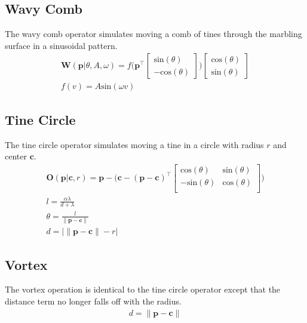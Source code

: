 \documentclass{article}
\newcommand{\cb}{\boldsymbol{c}}
\newcommand{\pb}{\boldsymbol{p}}
\renewcommand{\sin}{\text{sin}}
\renewcommand{\cos}{\text{cos}}
\begin{document}
\subsection{Wavy Comb}
The wavy comb operator simulates moving a comb of tines through the marbling surface in a sinusoidal pattern.
\begin{gather*}
	\boldsymbol{W}(\pb| \theta, A, \omega) = f\bigg(\pb^\top \begin{bmatrix}
	\sin(\theta)\\
	 -\cos(\theta)
	\end{bmatrix}\bigg) \begin{bmatrix}
	\cos(\theta)\\
	 \sin(\theta)
	\end{bmatrix}\\
    f(v) = A \sin(\omega v)
\end{gather*}

\subsection{Tine Circle}
The tine circle operator simulates moving a tine in a circle with radius $r$ and center $\cb$.
\begin{gather*}
	\boldsymbol{O}(\pb | \cb, r) =  \pb - \bigg(\cb - (\pb - \cb) ^ \top \begin{bmatrix}
	\cos(\theta) &\sin(\theta)\\
	-\sin(\theta) &\cos(\theta)\\
	\end{bmatrix} \bigg)\\
	l = \frac{\alpha \lambda}{d + \lambda}\\
	\theta = \frac{l}{\lVert\pb - \cb\rVert}\\
    d = |\lVert \pb - \cb\rVert - r|
\end{gather*}

\subsection{Vortex}
The vortex operation is identical to the tine circle operator except that the distance term no longer falls off with the radius.
\begin{gather*}
	d = \lVert\pb - \cb\rVert
\end{gather*}


\end{document}

